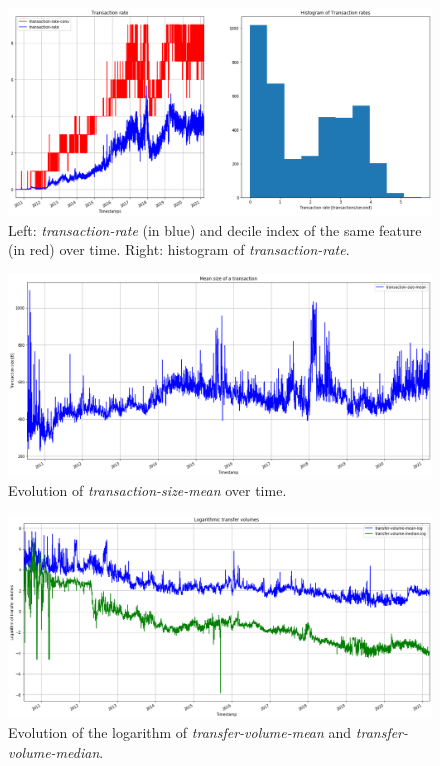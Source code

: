 \begin{figure}[H]
    \centering
    \includegraphics[width=\textwidth]{methods/images/transaction_rate.png}
    \caption{Left: \emph{transaction-rate} (in blue) and decile index of the same feature (in red) over time. Right: histogram of \emph{transaction-rate}.}
    \label{fig:transaction_rate}
\end{figure}

\begin{figure}[H]
    \centering
    \includegraphics[width=\textwidth]{methods/images/transaction_mean_size.png}
    \caption{Evolution of \emph{transaction-size-mean} over time.}
    \label{fig:transaction_size_mean}
\end{figure}

\begin{figure}[H]
    \centering
    \includegraphics[width=\textwidth]{methods/images/transfer_volume_central.png}
    \caption{Evolution of the logarithm of \emph{transfer-volume-mean} and \emph{transfer-volume-median}.}
    \label{fig:transfer_volume_central}
\end{figure}

